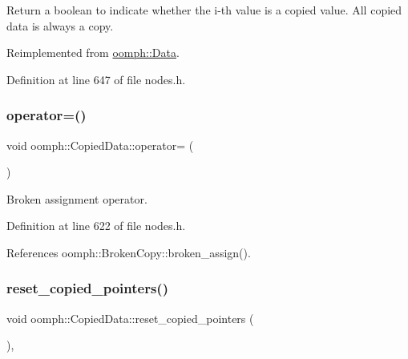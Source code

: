 Return a boolean to indicate whether the i-\/th value is a copied value. All copied data is always a copy. 



Reimplemented from \hyperlink{classoomph_1_1Data_ae31cff2285588c40cd33fac0cabcc371}{oomph\+::\+Data}.



Definition at line 647 of file nodes.\+h.

\mbox{\label{classoomph_1_1CopiedData_a1548a29a62fb5bb646af063a16a110c9}} 
\subsubsection{\texorpdfstring{operator=()}{operator=()}}
{\footnotesize\ttfamily void oomph\+::\+Copied\+Data\+::operator= (\begin{DoxyParamCaption}\item[{const \hyperlink{classoomph_1_1CopiedData}{Copied\+Data} \&}]{ }\end{DoxyParamCaption})\hspace{0.3cm}{\ttfamily [inline]}}



Broken assignment operator. 



Definition at line 622 of file nodes.\+h.



References oomph\+::\+Broken\+Copy\+::broken\+\_\+assign().

\mbox{\label{classoomph_1_1CopiedData_a7e29b2bb1cf0ebad16afac2e5d7342d8}} 
\subsubsection{\texorpdfstring{reset\+\_\+copied\+\_\+pointers()}{reset\_copied\_pointers()}}
{\footnotesize\ttfamily void oomph\+::\+Copied\+Data\+::reset\+\_\+copied\+\_\+pointers (\begin{DoxyParamCaption}{ }\end{DoxyParamCaption})\hspace{0.3cm}{\ttfamily [private]}, {\ttfamily [virtual]}}



